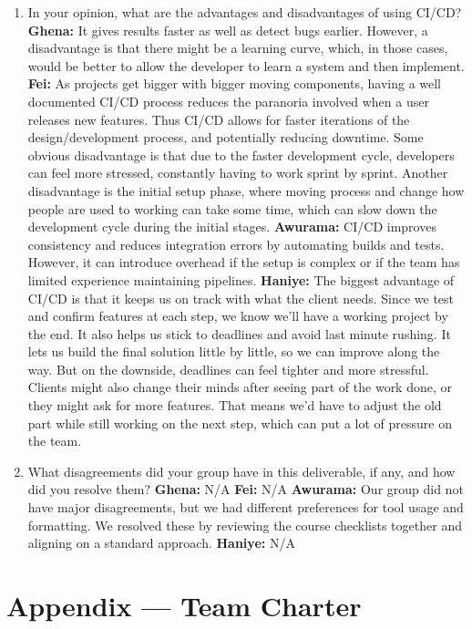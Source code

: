 \documentclass{article}
\begin{document}
\begin{enumerate}
    \item In your opinion, what are the advantages and disadvantages of using
    CI/CD?
      \textbf{Ghena:} It gives results faster as well as detect bugs earlier. However, a disadvantage is that there might be a learning curve, which, in those cases, would be better to allow the developer to learn a system and then implement. 
      \textbf{Fei:} As projects get bigger with bigger moving components, having a well documented CI/CD process reduces the paranoria involved when a user releases new features. Thus CI/CD allows for faster iterations of the design/development process, and potentially reducing downtime. Some obvious disadvantage is that due to the faster development cycle, developers can feel more stressed, constantly having to work sprint by sprint. Another disadvantage is the initial setup phase, where moving process and change how people are used to working can take some time, which can slow down the development cycle during the initial stages.
     \textbf{Awurama:} CI/CD improves consistency and reduces integration errors by 
    automating builds and tests. However, it can introduce overhead if the setup is 
    complex or if the team has limited experience maintaining pipelines.  
\textbf{Haniye:} The biggest advantage of CI/CD is that it keeps us on track with what the client needs. Since we test and confirm features at each step, we know we’ll have a working project by the end. It also helps us stick to deadlines and avoid last minute rushing. It lets us build the final solution little by little, so we can improve along the way. But on the downside, deadlines can feel tighter and more stressful. Clients might also change their minds after seeing part of the work done, or they might ask for more features. That means we’d have to adjust the old part while still working on the next step, which can put a lot of pressure on the team.
    \item What disagreements did your group have in this deliverable, if any,
    and how did you resolve them?
    \textbf{Ghena:} N/A
    \textbf{Fei:} N/A
    \textbf{Awurama:} Our group did not have major disagreements, but we had 
    different preferences for tool usage and formatting. We resolved these by reviewing 
    the course checklists together and aligning on a standard approach.
    \textbf{Haniye:} N/A
    
\end{enumerate}

\newpage{}

\section*{Appendix --- Team Charter}
\end{document}
